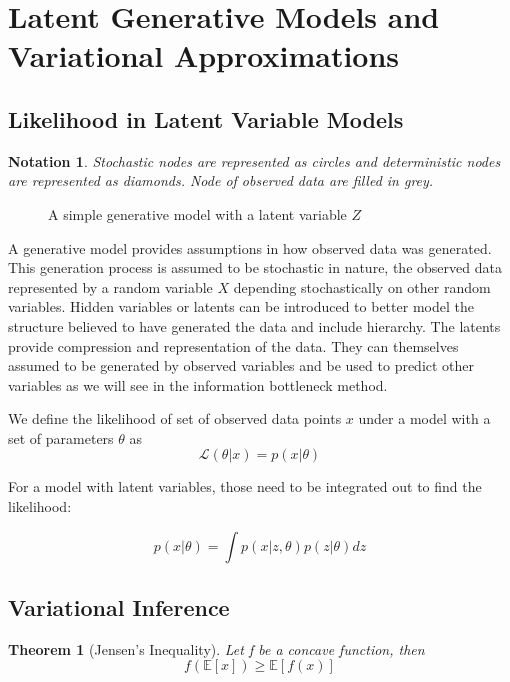 \documentclass[11pt,oneside,openright]{report}
\newtheorem{notation}{Notation}
\newtheorem{theorem}{Theorem}
\begin{document}
\section{Latent Generative Models and Variational Approximations}
\subsection{Likelihood in Latent Variable Models}
\begin{notation}
Stochastic nodes are represented as circles and deterministic nodes are represented as diamonds. Node of observed data are filled in grey.
\end{notation}

\begin{figure}[H]
\centering
{}
\caption{A simple generative model with a latent variable $Z$}
\end{figure}

A generative model provides assumptions in how observed data was generated. This generation process is assumed to be stochastic in nature, the observed data represented by a random variable $X$ depending stochastically on other random variables. Hidden variables or latents can be introduced to better model the structure believed to have generated the data and include hierarchy. The latents provide compression and representation of the data. They can themselves assumed to be generated by observed variables and be used to predict other variables as we will see in the information bottleneck method. 

We define the likelihood of set of observed data points $x$ under a model with a set of parameters $\theta$ as 
$$\mathcal{L}(\theta|x) = p(x|\theta)$$

For a model with latent variables, those need to be integrated out to find the likelihood:

\begin{equation}
p(x|\theta) = \int p(x|z, \theta) p(z|\theta) dz
\label{eq:lik}
\end{equation}

\subsection{Variational Inference}
\begin{theorem}[Jensen's Inequality]
Let f be a concave function, then
$$ f(\mathbb{E}[x]) \geq \mathbb{E}[f(x)] $$
\end{theorem}
\end{document}
